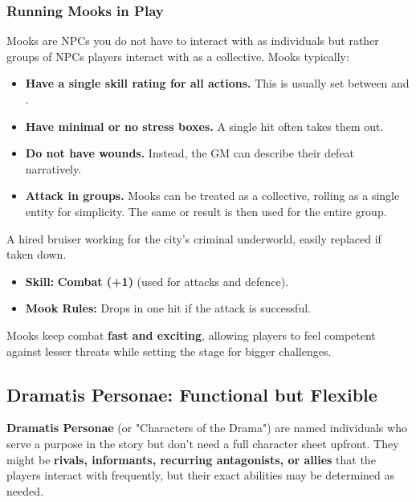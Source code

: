 \subsubsection{Running Mooks in Play}
Mooks are NPCs you do not have to interact with as individuals but rather groups of NPCs players interact with as a collective. Mooks typically:
\begin{itemize}
    \item \textbf{Have a single skill rating for all actions.} This is usually set between \Weak and \Skilled.
    \item \textbf{Have minimal or no stress boxes.} A single hit often takes them out.
    \item \textbf{Do not have wounds.} Instead, the GM can describe their defeat narratively.
    \item \textbf{Attack in groups.} Mooks can be treated as a collective, rolling as a single entity for simplicity. The same \Attack or \Defend result is then used for the entire group.
\end{itemize}

\begin{WyrdExample}
	A hired bruiser working for the city’s criminal underworld, easily replaced if taken down.
	\begin{itemize}
    	\item \textbf{Skill:} \textbf{Combat (+1)} (used for attacks and defence).
	    \item \textbf{Mook Rules:} Drops in one hit if the attack is successful.
	\end{itemize}
\end{WyrdExample}

Mooks keep combat \textbf{fast and exciting}, allowing players to feel competent against lesser threats while setting the stage for bigger challenges.

\subsection{Dramatis Personae: Functional but Flexible}
\textbf{Dramatis Personae} (or "Characters of the Drama") are named individuals who serve a purpose in the story but don’t need a full character sheet upfront. They might be \textbf{rivals, informants, recurring antagonists, or allies} that the players interact with frequently, but their exact abilities may be determined as needed.

